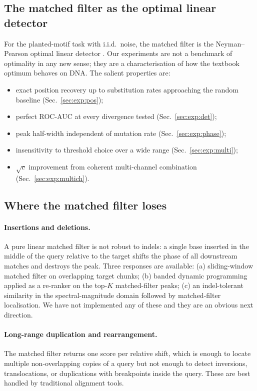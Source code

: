 \documentclass[11pt,a4paper]{article}
\theoremstyle{definition}
\theoremstyle{remark}
\begin{document}
\subsection{The matched filter as the optimal linear detector}

For the planted-motif task with i.i.d.\ noise, the matched filter is
the Neyman--Pearson optimal linear detector \citep{neyman1933,
turin1960, kay1998}. Our experiments are not a benchmark of optimality
in any new sense; they are a characterisation of how the textbook
optimum behaves on DNA. The salient properties are:
\begin{itemize}
\item exact position recovery up to substitution rates approaching the
random baseline (Sec.~\ref{sec:exp:pos});
\item perfect ROC-AUC at every divergence tested
(Sec.~\ref{sec:exp:det});
\item peak half-width independent of mutation rate
(Sec.~\ref{sec:exp:phase});
\item insensitivity to threshold choice over a wide range
(Sec.~\ref{sec:exp:multi});
\item $\sqrt{c}$ improvement from coherent multi-channel combination
(Sec.~\ref{sec:exp:multich}).
\end{itemize}

\subsection{Where the matched filter loses}
\label{sec:discussion:limits}

\paragraph{Insertions and deletions.} A pure linear matched filter is
not robust to indels: a single base inserted in the middle of the
query relative to the target shifts the phase of all downstream
matches and destroys the peak. Three responses are available:
(a) sliding-window matched filter on overlapping target chunks;
(b) banded dynamic programming applied as a re-ranker on the top-$K$
matched-filter peaks; (c) an indel-tolerant similarity in the
spectral-magnitude domain followed by matched-filter localisation.
We have not implemented any of these and they are an obvious next
direction.

\paragraph{Long-range duplication and rearrangement.} The matched filter
returns one score per relative shift, which is enough to locate
multiple non-overlapping copies of a query but not enough to detect
inversions, translocations, or duplications with breakpoints inside
the query. These are best handled by traditional alignment tools.
\end{document}
